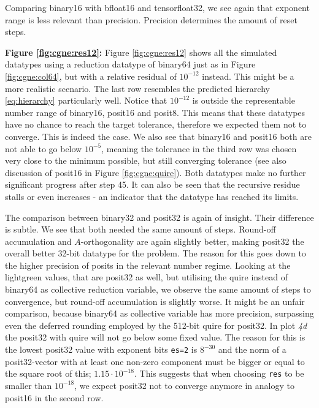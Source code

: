 \documentclass{article}
\theoremstyle{plain} %
\theoremstyle{convention} %
\theoremstyle{remark} %
\def\code#1{\texttt{#1}}
\numberwithin{equation}{section}
\begin{document}
Comparing \gls{binary16} with \gls{bfloat16} and \gls{tensorfloat32}, we see again that exponent range is less relevant than precision. Precision determines the amount of reset steps.

\textbf{Figure \ref{fig:cgne:res12}:} Figure \ref{fig:cgne:res12} shows all the simulated datatypes using a reduction datatype of \gls{binary64} just as in Figure \ref{fig:cgne:col64}, but with a relative residual of $10^{-12}$ instead. This might be a more realistic scenario. The last row resembles the predicted hierarchy \eqref{eq:hierarchy} particularly well. Notice that $10^{-12}$ is outside the representable number range of \gls{binary16}, \gls{posit16} and \gls{posit8}. This means that these datatypes have no chance to reach the target tolerance, therefore we expected them not to converge. This is indeed the case. We also see that \gls{binary16} and \gls{posit16} both are not able to go below $10^{-5}$, meaning the tolerance in the third row was chosen very close to the minimum possible, but still converging tolerance (see also discussion of \gls{posit16} in Figure \ref{fig:cgne:quire}). Both datatypes make no further significant progress after step \num{45}. It can also be seen that the recursive residue stalls or even increases - an indicator that the datatype has reached its limits.

The comparison between \gls{binary32} and \gls{posit32} is again of insight. Their difference is subtle. We see that both needed the same amount of steps. Round-off accumulation and $A$-orthogonality are again slightly better, making \gls{posit32} the overall better \num{32}-bit datatype for the problem. The reason for this goes down to the higher precision of posits in the relevant number regime. Looking at the \textcolor{clightgreen}{lightgreen} values, that are \gls{posit32} as well, but utilising the \gls{quire} instead of \gls{binary64} as collective reduction variable, we observe the same amount of steps to convergence, but round-off accumulation is slightly worse. It might be an unfair comparison, because \gls{binary64} as collective variable has more precision, surpassing even the deferred rounding employed by the \num{512}-bit \gls{quire} for \gls{posit32}. In plot \textit{4d} the \gls{posit32} with \gls{quire} will not go below some fixed value. The reason for this is the lowest \gls{posit32} value with exponent bits \code{es=2} is $8^{-30}$ and the norm of a \gls{posit32}-vector with at least one non-zero component must be bigger or equal to the square root of this; $1.15 \cdot 10^{-18}$. This suggests that when choosing \code{res} to be smaller than $10^{-18}$, we expect \gls{posit32} not to converge anymore in analogy to \gls{posit16} in the second row.
\end{document}
